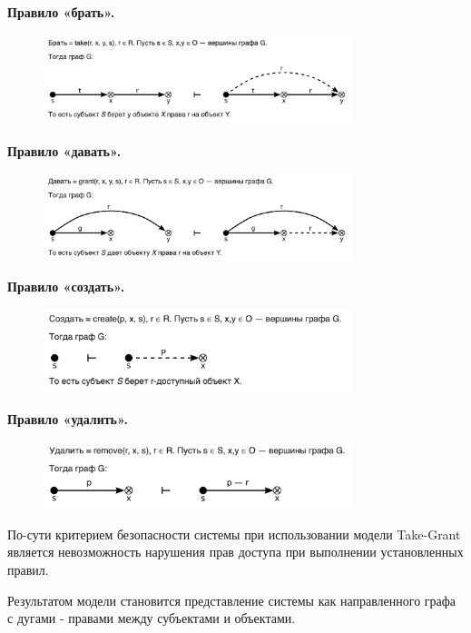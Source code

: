 \textbf{Правило «брать».}
\begin{figure}[H]
    \centering
    \includegraphics[width=0.8\textwidth]{assets/models/take_grant_bring.png}
\end{figure}

\textbf{Правило «давать».}
\begin{figure}[H]
    \centering
    \includegraphics[width=0.8\textwidth]{assets/models/take_grant_give.png}
\end{figure}

\textbf{Правило «создать».}
\begin{figure}[H]
    \centering
    \includegraphics[width=0.8\textwidth]{assets/models/take_grant_create.png}
\end{figure}

\textbf{Правило «удалить».}
\begin{figure}[H]
    \centering
    \includegraphics[width=0.8\textwidth]{assets/models/take_grant_delete.png}
\end{figure}

По-сути критерием безопасности системы при использовании модели Take-Grant является невозможность нарушения
прав доступа при выполнении установленных правил.

Результатом модели становится представление системы как направленного графа с дугами - правами между субъектами
и объектами.

